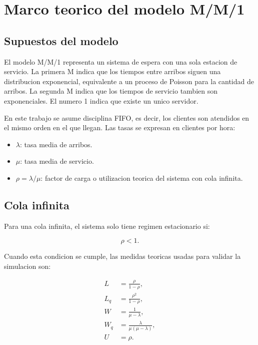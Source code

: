 \section{Marco teorico del modelo M/M/1}

\subsection{Supuestos del modelo}

El modelo M/M/1 representa un sistema de espera con una sola estacion de servicio. La primera M indica que los tiempos entre arribos siguen una distribucion exponencial, equivalente a un proceso de Poisson para la cantidad de arribos. La segunda M indica que los tiempos de servicio tambien son exponenciales. El numero 1 indica que existe un unico servidor.

En este trabajo se asume disciplina FIFO, es decir, los clientes son atendidos en el mismo orden en el que llegan. Las tasas se expresan en clientes por hora:

\begin{itemize}
    \item $\lambda$: tasa media de arribos.
    \item $\mu$: tasa media de servicio.
    \item $\rho = \lambda / \mu$: factor de carga o utilizacion teorica del sistema con cola infinita.
\end{itemize}

\subsection{Cola infinita}

Para una cola infinita, el sistema solo tiene regimen estacionario si:

\begin{equation}
    \rho < 1.
\end{equation}

Cuando esta condicion se cumple, las medidas teoricas usadas para validar la simulacion son:

\begin{align}
    L &= \frac{\rho}{1-\rho}, \\
    L_q &= \frac{\rho^2}{1-\rho}, \\
    W &= \frac{1}{\mu-\lambda}, \\
    W_q &= \frac{\lambda}{\mu(\mu-\lambda)}, \\
    U &= \rho.
\end{align}

